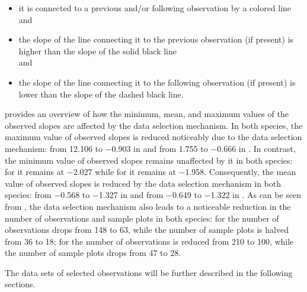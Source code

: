 \begin{itemize}
\item it is connected to a previous and/or following observation by a colored line \\
  and
\item the slope of the line connecting it to the previous observation (if present) is higher than the slope of the solid black line \\
  and
\item the slope of the line connecting it to the following observation (if present) is lower than the slope of the dashed black line.
\end{itemize}
 provides an overview of how the minimum, mean, and maximum values of the observed slopes are affected by the data selection mechanism.  In both species, the maximum value of observed slopes is reduced noticeably due to the data selection mechanism: from \num{12.106} to \num{-0.903} in \Beech{} and from \num{1.755} to \num{-0.666} in \Spruce{}.  In contrast, the minimum value of observed slopes remains unaffected by it in both species: for \Beech{} it remains at \num{-2.027} while for \Spruce{} it remains at \num{-1.958}.  Consequently, the mean value of observed slopes is reduced by the data selection mechanism in both species: from \num{-0.568} to \num{-1.327} in \Beech{} and from \num{-0.649} to \num{-1.322} in \Spruce{}.  As can be seen from , the data selection mechanism also leads to a noticeable reduction in the number of observations and sample plots in both species: for \Beech{} the number of observations drops from \num{148} to \num{63}, while the number of sample plots is halved from \num{36} to \num{18}; for \Spruce{} the number of observations is reduced from \num{210} to \num{100}, while the number of sample plots drops from \num{47} to \num{28}.

The data sets of selected observations will be further described in the following sections.


